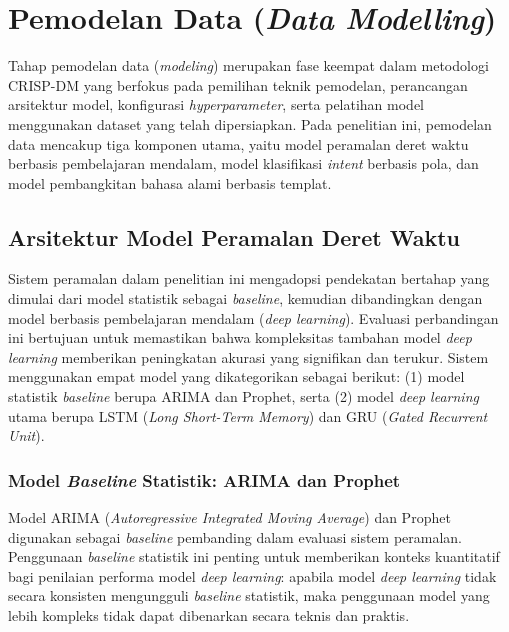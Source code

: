 \section{Pemodelan Data (\textit{Data Modelling})}
\label{sec:data-modelling}

Tahap pemodelan data (\textit{modeling}) merupakan fase keempat dalam metodologi CRISP-DM yang berfokus pada pemilihan teknik pemodelan, perancangan arsitektur model, konfigurasi \textit{hyperparameter}, serta pelatihan model menggunakan dataset yang telah dipersiapkan. Pada penelitian ini, pemodelan data mencakup tiga komponen utama, yaitu model peramalan deret waktu berbasis pembelajaran mendalam, model klasifikasi \textit{intent} berbasis pola, dan model pembangkitan bahasa alami berbasis templat.

\subsection{Arsitektur Model Peramalan Deret Waktu}
\label{subsec:arsitektur-forecasting}

Sistem peramalan dalam penelitian ini mengadopsi pendekatan bertahap yang dimulai dari model statistik sebagai \textit{baseline}, kemudian dibandingkan dengan model berbasis pembelajaran mendalam (\textit{deep learning}). Evaluasi perbandingan ini bertujuan untuk memastikan bahwa kompleksitas tambahan model \textit{deep learning} memberikan peningkatan akurasi yang signifikan dan terukur. Sistem menggunakan empat model yang dikategorikan sebagai berikut: (1) model statistik \textit{baseline} berupa ARIMA dan Prophet, serta (2) model \textit{deep learning} utama berupa LSTM (\textit{Long Short-Term Memory}) dan GRU (\textit{Gated Recurrent Unit}).

\subsubsection{Model \textit{Baseline} Statistik: ARIMA dan Prophet}

Model ARIMA (\textit{Autoregressive Integrated Moving Average}) dan Prophet digunakan sebagai \textit{baseline} pembanding dalam evaluasi sistem peramalan. Penggunaan \textit{baseline} statistik ini penting untuk memberikan konteks kuantitatif bagi penilaian performa model \textit{deep learning}: apabila model \textit{deep learning} tidak secara konsisten mengungguli \textit{baseline} statistik, maka penggunaan model yang lebih kompleks tidak dapat dibenarkan secara teknis dan praktis.


